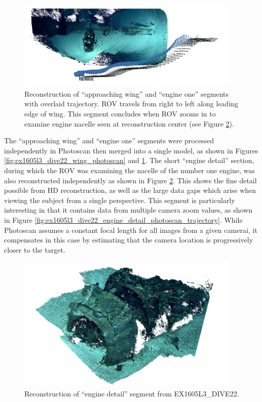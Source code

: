\documentclass[letterpaper,12pt]{article}
\begin{document}
\begin{figure}
    \centering
    \includegraphics[width=0.95\textwidth]{images/approaching_wing_photoscan_trajectory.png}
    \caption{Reconstruction of ``approaching wing'' and ``engine one'' segments with overlaid trajectory.  ROV travels from right to left along leading edge of wing.   This segment concludes when ROV zooms in to examine engine nacelle seen at reconstruction center (see Figure \ref{fig:ex1605l3_dive22_engine_detail_photoscan}).}
    \label{fig:ex1605l3_dive22_wing_photoscan_trajectory}
\end{figure}

The ``approaching wing'' and ``engine one'' segments were processed independently in Photoscan then merged into a single model, as shown in Figures \ref{fig:ex1605l3_dive22_wing_photoscan} and \ref{fig:ex1605l3_dive22_wing_photoscan_trajectory}. 
The short ``engine detail'' section, during which the ROV was examining the nacelle of the number one engine, was also reconstructed independently as shown in Figure \ref{fig:ex1605l3_dive22_engine_detail_photoscan}.    This shows the fine detail possible from HD reconstruction, as well as the large data gaps which arise when viewing the subject from a single perspective.   This segment is particularly interesting in that it contains data from multiple camera zoom values, as shown in Figure \ref{fig:ex1605l3_dive22_engine_detail_photoscan_trajectory}.   While Photoscan assumes a constant focal length for all images from a given camerai, it compensates in this case by estimating that the camera location is progressively closer to the target.


\begin{figure}
    \centering
    \includegraphics[width=0.95\textwidth]{images/engine_detail_photoscan.png}
    \caption{Reconstruction of ``engine detail'' segment from EX1605L3\_DIVE22.}
    \label{fig:ex1605l3_dive22_engine_detail_photoscan}
\end{figure}
\end{document}
